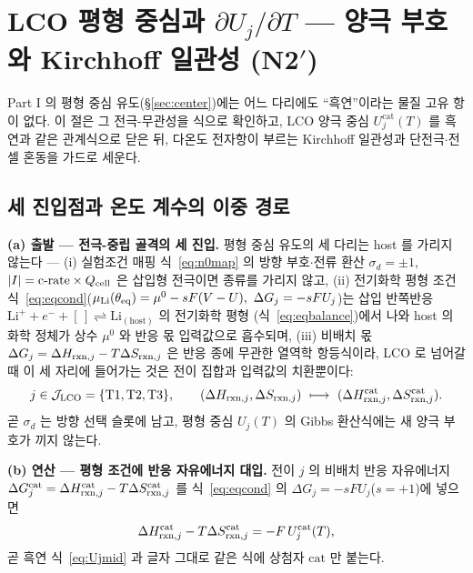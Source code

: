 \section{LCO 평형 중심과 $\partial U_j/\partial T$ --- 양극 부호와 Kirchhoff 일관성 (N2$'$)}\label{sec:lco-center}
Part I 의 평형 중심 유도(\S\ref{sec:center})에는 어느 다리에도 ``흑연''이라는 물질 고유 항이 없다. 이 절은 그
전극-무관성을 식으로 확인하고, LCO 양극 중심 $U_j^\mathrm{cat}(T)$ 를 흑연과 같은 관계식으로 닫은 뒤, 다온도
전자항이 부르는 Kirchhoff 일관성과 단전극$\cdot$전셀 혼동을 가드로 세운다.

\subsection{세 진입점과 온도 계수의 이중 경로}\label{sec:lco-center-deriv}
\textbf{(a) 출발 --- 전극-중립 골격의 세 진입.} 평형 중심 유도의 세 다리는 host 를 가리지 않는다 ---
(i) 실험조건 매핑 식~\eqref{eq:n0map} 의 방향 부호$\cdot$전류 환산
$\sigma_d=\pm1$, $|I|=\text{c-rate}\times Q_{\mathrm{cell}}$ 은 삽입형 전극이면 종류를 가리지 않고, (ii) 전기화학 평형
조건 식~\eqref{eq:eqcond}($\mu_\mathrm{Li}(\theta_{\mathrm{eq}})=\mu^0-sF(V-U),\ \Delta G_j=-sFU_j$)는 삽입
반쪽반응 $\mathrm{Li}^++e^-+[\,]\rightleftharpoons\mathrm{Li}_{(\text{host})}$ 의 전기화학 평형
(식~\eqref{eq:eqbalance})에서 나와 host 의 화학 정체가 상수 $\mu^0$ 와 반응 몫 입력값으로 흡수되며,
(iii) 비배치 몫 $\Delta G_j=\Delta H_{\mathrm{rxn},j}-T\Delta S_{\mathrm{rxn},j}$ 은 반응 종에 무관한 열역학 항등식이라,
LCO 로 넘어갈 때 이 세 자리에 들어가는 것은 전이 집합과 입력값의 치환뿐이다:
\begin{equation}
j\in\mathcal J_\mathrm{LCO}=\{\mathrm{T1},\mathrm{T2},\mathrm{T3}\},\qquad
(\Delta H_{\mathrm{rxn},j},\Delta S_{\mathrm{rxn},j})\ \longmapsto\
(\Delta H_{\mathrm{rxn},j}^\mathrm{cat},\Delta S_{\mathrm{rxn},j}^\mathrm{cat}).
\label{eq:lco-n0sub}
\end{equation}
곧 $\sigma_d$ 는 방향 선택 슬롯에 남고, 평형 중심 $U_j(T)$ 의 Gibbs 환산식에는 새 양극 부호가 끼지 않는다.

\textbf{(b) 연산 --- 평형 조건에 반응 자유에너지 대입.}
전이 $j$ 의 비배치 반응 자유에너지 $\Delta G_j^\mathrm{cat}=\Delta H_{\mathrm{rxn},j}^\mathrm{cat}
-T\Delta S_{\mathrm{rxn},j}^\mathrm{cat}$ 를 식~\eqref{eq:eqcond} 의 $\Delta G_j=-sFU_j$($s=+1$)에 넣으면
\[
\Delta H_{\mathrm{rxn},j}^\mathrm{cat}-T\Delta S_{\mathrm{rxn},j}^\mathrm{cat}=-F\,U_j^\mathrm{cat}(T),
\]
곧 흑연 식~\eqref{eq:Ujmid} 과 글자 그대로 같은 식에 상첨자 $\mathrm{cat}$ 만 붙는다.

